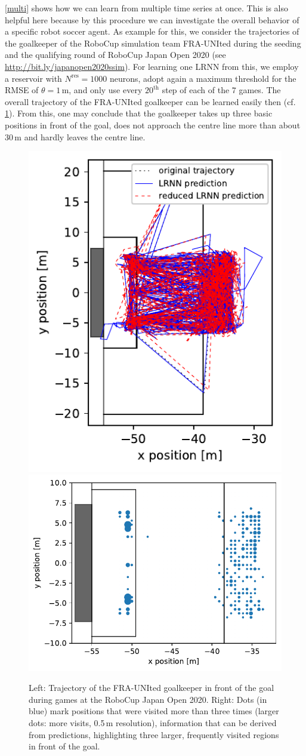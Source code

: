 \documentclass[preprint,12pt,times,authoryear]{elsarticle}%
\theoremstyle{definition}
\begin{document}
\cref{multi} shows how we can learn from multiple time series at once. This is
also helpful here because by this procedure we can investigate the overall
behavior of a specific robot soccer agent. As example for this, we consider the
trajectories of the goalkeeper of the RoboCup simulation team FRA-UNIted during
the seeding and the qualifying round of RoboCup Japan Open 2020 (see
\url{http://bit.ly/japanopen2020ssim}). For learning one LRNN from this, we employ a
reservoir with $N^\mathrm{res} = 1000$ neurons, adopt again a maximum threshold
for the RMSE of $\theta = 1$\,m, and only use every $20^\text{th}$ step of each of the
$7$ games. The overall trajectory of the FRA-UNIted goalkeeper can be learned
easily then (cf. \cref{frankfurt}). From this, one may conclude that the
goalkeeper takes up three basic positions in front of the goal, does not
approach the centre line more than about 30\,m and hardly leaves the centre
line.

\begin{figure}
\centering
\hfill %
\includegraphics[width=0.34\columnwidth]{fig/goalie}     %
\hfill %
\includegraphics[width=0.57\columnwidth]{fig/goalievisits} %
\hfill %
\caption{Left: Trajectory of the FRA-UNIted goalkeeper in front of the goal
during games at the RoboCup Japan Open 2020. Right: Dots (in blue) mark positions
that were visited more than three times (larger dots: more visits, 0.5\,m resolution),
information that can be derived from predictions, highlighting three larger,
frequently visited regions in front of the goal.}
\label{frankfurt}
\end{figure}
\end{document}
